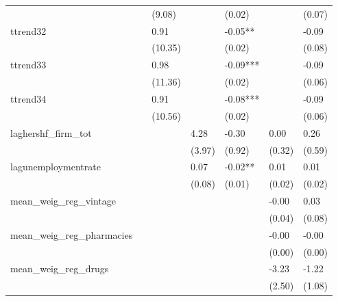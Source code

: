 \begin{table}
\begin{center}
\begin{tabular}{lllllll}
                            &              & (9.08)       &              & (0.02)       &              & (0.07)        \\
ttrend32                    &              & 0.91         &              & -0.05**      &              & -0.09         \\
                            &              & (10.35)      &              & (0.02)       &              & (0.08)        \\
ttrend33                    &              & 0.98         &              & -0.09***     &              & -0.09         \\
                            &              & (11.36)      &              & (0.02)       &              & (0.06)        \\
ttrend34                    &              & 0.91         &              & -0.08***     &              & -0.09         \\
                            &              & (10.56)      &              & (0.02)       &              & (0.06)        \\
laghershf\_firm\_tot        &              &              & 4.28         & -0.30        & 0.00         & 0.26          \\
                            &              &              & (3.97)       & (0.92)       & (0.32)       & (0.59)        \\
lagunemploymentrate         &              &              & 0.07         & -0.02**      & 0.01         & 0.01          \\
                            &              &              & (0.08)       & (0.01)       & (0.02)       & (0.02)        \\
mean\_weig\_reg\_vintage    &              &              &              &              & -0.00        & 0.03          \\
                            &              &              &              &              & (0.04)       & (0.08)        \\
mean\_weig\_reg\_pharmacies &              &              &              &              & -0.00        & -0.00         \\
                            &              &              &              &              & (0.00)       & (0.00)        \\
mean\_weig\_reg\_drugs      &              &              &              &              & -3.23        & -1.22         \\
                            &              &              &              &              & (2.50)       & (1.08)        \\

\end{tabular}
\end{center}
\end{table}
